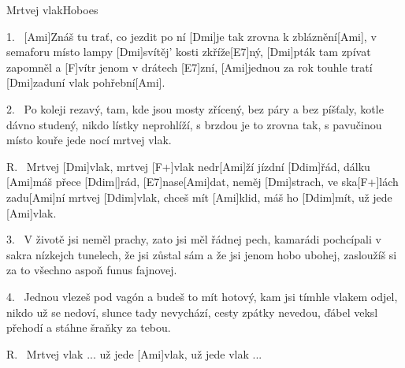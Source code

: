 \begin{song}{Mrtvej vlak}{Hoboes}

\begin{xverse}{1.~}
[\large Ami]Znáš tu trať, co jezdit po ní [\large Dmi]je tak zrovna k zbláznění[\large Ami],
v semaforu místo lampy [\large Dmi]svítěj' kosti zkříže[\large E7]ný,
[\large Dmi]pták tam zpívat zapomněl a [\large F]vítr jenom v drátech [\large E7]zní,
[\large Ami]jednou za rok touhle tratí [\large Dmi]zaduní vlak pohřební[\large Ami].
\end{xverse}

\begin{xverse}{2.~}
Po koleji rezavý, tam, kde jsou mosty zřícený,
bez páry a bez píšťaly, kotle dávno studený,
nikdo lístky neprohlíží, s brzdou je to zrovna tak,
s pavučinou místo kouře jede nocí mrtvej vlak.
\end{xverse}

\begin{xverse}{R.~}
Mrtvej [\large Dmi]vlak, mrtvej [\large F+]vlak nedr[\large Ami]{}ží jízdní [\large Ddim]{}řád,
dálku [\large Ami]máš přece [\large Ddim|]{rád,} [\large E7]nase[\large Ami]dat,
neměj [\large Dmi]strach, ve ska[\large F+]lách zadu[\large Ami]ní mrtvej [\large Ddim]vlak,
chceš mít [\large Ami]klid, máš ho [\large Ddim]mít, už jede [\large Ami]vlak.
\end{xverse}

\begin{xverse}{3.~}
V životě jsi neměl prachy, zato jsi měl řádnej pech,
kamarádi pochcípali v sakra nízkejch tunelech,
že jsi zůstal sám a že jsi jenom hobo ubohej,
zasloužíš si za to všechno aspoň funus fajnovej.
\end{xverse}

\begin{xverse}{4.~}
Jednou vlezeš pod vagón a budeš to mít hotový,
kam jsi tímhle vlakem odjel, nikdo už se nedoví,
slunce tady nevychází, cesty zpátky nevedou,
ďábel veksl přehodí a stáhne šraňky za tebou.
\end{xverse}

\begin{xverse}{R.~}
Mrtvej vlak ...
už jede [\large Ami]vlak, už jede vlak ...
\end{xverse}

\end{song}

